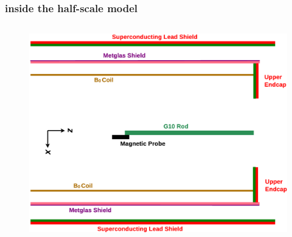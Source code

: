 \documentclass[handout]{beamer}
\begin{document}
\begin{frame}
\begin{columns}
    \end{columns}

\end{frame}

\begin{frame}
\frametitle{inside the half-scale model}

    \begin{columns}
    
    \begin{column}{0.5\textwidth}
    \begin{figure}
    \includegraphics[width=\textwidth, angle=90, trim=70px 70px 70px 70px]
    {figures/simplified_structure.eps}
    \end{figure}
    \end{column}

    \pause


\end{columns}
\end{frame}
\end{document}
